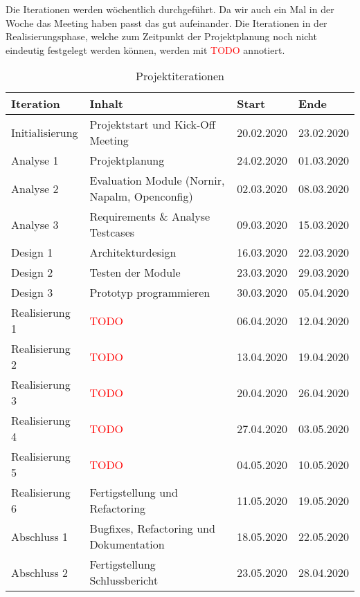 \documentclass[
	ngerman,
	toc=listof, %
	toc=bibliography, %
	footnotes=multiple, %
	parskip=half, %
	numbers=noendperiod %
]{scrartcl}
\begin{document}
		Die Iterationen werden wöchentlich durchgeführt.
		Da wir auch ein Mal in der Woche das Meeting haben passt das gut aufeinander.
		Die Iterationen in der Realisierungsphase, welche zum Zeitpunkt der Projektplanung noch nicht eindeutig festgelegt werden können, werden mit \textcolor{red}{TODO} annotiert.

		\begin{table}[!h]
			\begin{tabularx}{\textwidth}{lXll}
				\toprule
				Iteration & Inhalt & Start & Ende \\
				\midrule
				Initialisierung & Projektstart und Kick-Off Meeting & 20.02.2020 & 23.02.2020 \\
				Analyse 1 & Projektplanung & 24.02.2020 & 01.03.2020 \\
				Analyse 2 & Evaluation Module (Nornir, Napalm, Openconfig) & 02.03.2020 & 08.03.2020 \\
				Analyse 3 & Requirements \& Analyse Testcases & 09.03.2020 & 15.03.2020 \\
				Design 1 & Architekturdesign & 16.03.2020 & 22.03.2020 \\
				Design 2 & Testen der Module & 23.03.2020 & 29.03.2020 \\
				Design 3 & Prototyp programmieren & 30.03.2020 & 05.04.2020 \\
				Realisierung 1 & \textcolor{red}{TODO} & 06.04.2020 & 12.04.2020 \\
				Realisierung 2 & \textcolor{red}{TODO} & 13.04.2020 & 19.04.2020 \\
				Realisierung 3 & \textcolor{red}{TODO} & 20.04.2020 & 26.04.2020 \\
				Realisierung 4 & \textcolor{red}{TODO} & 27.04.2020 & 03.05.2020 \\
				Realisierung 5 & \textcolor{red}{TODO} & 04.05.2020 & 10.05.2020 \\
				Realisierung 6 & Fertigstellung und Refactoring & 11.05.2020 & 19.05.2020 \\
				Abschluss 1 & Bugfixes, Refactoring und Dokumentation & 18.05.2020 & 22.05.2020\\
				Abschluss 2 & Fertigstellung Schlussbericht & 23.05.2020 & 28.04.2020\\
				\bottomrule
			\end{tabularx}
			\caption{Projektiterationen}
		\end{table}
\end{document}
